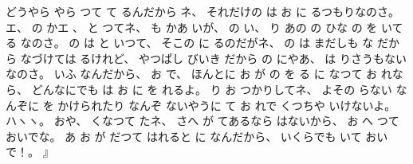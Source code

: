 %
どうやら
やら
つて
て
るんだから
%
ネ、
%
それだけの
は
お
に
るつもりなのさ。
%
エ、
%
の
かエ
、
%
%
と
つてネ、
%
も
かあ
いが、
%
の
い、
%
り
あの
の
ひな
の
を
いてる
なのさ。
%
の
は
と
いつて、
%
そこの
に
るのだがネ、
%
の
は
まだしも
な
だから
なづけては
るけれど、
%
やつぱし
びいき
だから
の
にやあ、
%
は
りさうもない
なのさ。
%
いふ
なんだから、
%
お
で、
%
ほんとに
お
が
の
を
る
に
なつて
お
れなら、
%
どんなにでも
は
お
に
を
れるよ。
%
%
り
お
つかりしてネ、
%
よその
らない
なんぞに
を
かけられたり
なんぞ
ないやうに
て
お
れで
くつちや
いけないよ。
%
ハヽヽ。
%
おや、
%
くなつて
たネ、
%
さへ
が
てあるなら
はないから、
%
お
へ
つて
おいでな。
%
あ
お
が
だつて
はれると
に
なんだから、
%
いくらでも
いて
おいで！。
』
